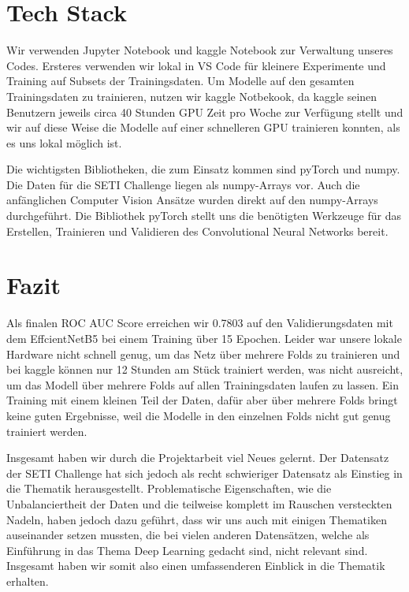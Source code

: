 \documentclass[12pt, a4paper]{article}
\begin{document}
\section{Tech Stack}
Wir verwenden Jupyter Notebook und kaggle Notebook zur Verwaltung unseres Codes. Ersteres verwenden wir lokal in VS Code für kleinere Experimente und Training auf Subsets der Trainingsdaten. Um Modelle auf den gesamten Trainingsdaten zu trainieren, nutzen wir kaggle Notbekook, da kaggle seinen Benutzern jeweils circa 40 Stunden GPU Zeit pro Woche zur Verfügung stellt und wir auf diese Weise die Modelle auf einer schnelleren GPU trainieren konnten, als es uns lokal möglich ist.

Die wichtigsten Bibliotheken, die zum Einsatz kommen sind pyTorch und numpy. Die Daten für die SETI Challenge liegen als numpy-Arrays vor. Auch die anfänglichen Computer Vision Ansätze wurden direkt auf den numpy-Arrays durchgeführt. Die Bibliothek pyTorch stellt uns die benötigten Werkzeuge für das Erstellen, Trainieren und Validieren des Convolutional Neural Networks bereit.

\section{Fazit}
Als finalen ROC AUC Score erreichen wir 0.7803 auf den Validierungsdaten mit dem EffcientNetB5 bei einem Training über 15 Epochen. Leider war unsere lokale Hardware nicht schnell genug, um das Netz über mehrere Folds zu trainieren und bei kaggle können nur 12 Stunden am Stück trainiert werden, was nicht ausreicht, um das Modell über mehrere Folds auf allen Trainingsdaten laufen zu lassen. Ein Training mit einem kleinen Teil der Daten, dafür aber über mehrere Folds bringt keine guten Ergebnisse, weil die Modelle in den einzelnen Folds nicht gut genug trainiert werden.

Insgesamt haben wir durch die Projektarbeit viel Neues gelernt. Der Datensatz der SETI Challenge hat sich jedoch als recht schwieriger Datensatz als Einstieg in die Thematik herausgestellt. Problematische Eigenschaften, wie die Unbalanciertheit der Daten und die teilweise komplett im Rauschen versteckten Nadeln, haben jedoch dazu geführt, dass wir uns auch mit einigen Thematiken auseinander setzen mussten, die bei vielen anderen Datensätzen, welche als Einführung in das Thema Deep Learning gedacht sind, nicht relevant sind. Insgesamt haben wir somit also einen umfassenderen Einblick in die Thematik erhalten.

\newpage


\end{document}
